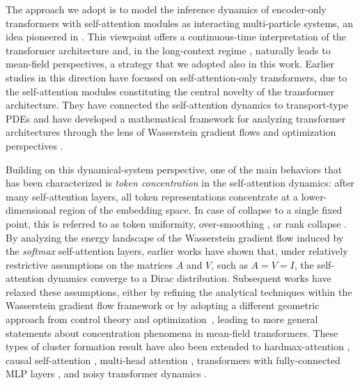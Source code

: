 \documentclass[10pt]{article}
\theoremstyle{definition}
\theoremstyle{definition}
\numberwithin{equation}{section}
\begin{document}
The approach we adopt is to model the inference dynamics of encoder-only transformers with self-attention modules as interacting multi-particle systems, an idea pioneered in \cite{lu2019understanding,dutta2021redesigning}.
This viewpoint offers a continuous-time interpretation of the transformer architecture and, in the long-context regime \cite{peng2024yarn,yang2025qwen3,swan2025puvvada,qu2026tabiclv2},
naturally leads to mean-field perspectives, 
a strategy that we adopted also in this work.
Earlier studies in this direction have focused on self-attention-only transformers, due to the self-attention modules constituting the central novelty of the transformer architecture.
They have connected the self-attention dynamics to transport-type PDEs \cite{sander2022sinkformers}
and have
developed a mathematical framework for analyzing transformer architectures through the lens of Wasserstein gradient flows \cite{sander2022sinkformers,geshkovski2023mathematical,burger2025analysis}
and optimization perspectives \cite{alcalde2026quantifying}.

Building on this dynamical-system perspective, one of the main behaviors that has been characterized is \emph{token concentration} in the self-attention dynamics: after many self-attention layers, all token representations concentrate at a lower-dimensional region of the embedding space. 
In case of collapse to a single fixed point, this is  referred to as token uniformity, over-smoothing \cite{chen2022principle,guo2023contranorm,wu2023demystifying,chen2025residual}, or rank collapse \cite{dong2021attention,feng2022rank,cowsik2025geometric,giorlandino2026two}.
By analyzing the energy landscape of the Wasserstein gradient flow induced by the \emph{softmax} self-attention layers, earlier works \cite{geshkovski2023mathematical,criscitiello2024synchronization,polyanskiy2025synchronization} have shown that, under relatively restrictive assumptions on the matrices $A$ and $V$, such as $A = V = I$, the self-attention dynamics converge to a Dirac distribution.
Subsequent works have relaxed these assumptions, either by refining the analytical techniques within the Wasserstein gradient flow framework \cite{chen2025quantitative} or by adopting a different geometric approach from control theory \cite{abella2024asymptotic,abella2025consensus,altafini2026multistability} and optimization~\cite{alcalde2026quantifying},
leading to more general statements about concentration phenomena in mean-field transformers.
These types of cluster formation result have also been extended to hardmax-attention \cite{alcalde2025clustering,alcalde2025attention}, causal self-attention \cite{karagodin2024causal,abella2024asymptotic,abella2025consensus}, multi-head attention \cite{abella2024asymptotic,abella2025consensus,massucco2026multi}, transformers with fully-connected MLP layers \cite{alvarez2026perceptrons,koubbi2026homogenized,fedorov2026clustering,agazzi2026stochastic,alcalde2026reachability}, and noisy transformer dynamics \cite{balasubramanian2025structure,alvarez2026perceptrons,koubbi2026homogenized,fedorov2026clustering,agazzi2026stochastic,engel2026random,mun2026phaseA,mun2026phaseB,mun2026bphaseC}. 
\end{document}
